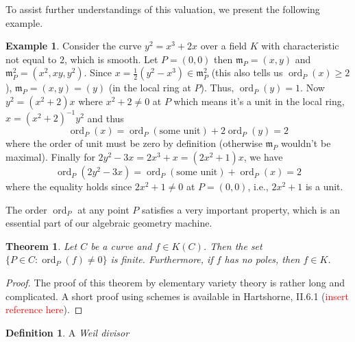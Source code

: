 \documentclass[12pt]{article}
\newtheorem{theorem}{Theorem}[subsection]
\theoremstyle{remark}
\theoremstyle{definition}
\newtheorem{example}{Example}[subsection]
\newtheorem{definition}{Definition}[subsection]
\newcommand{\ord}[0]{\operatorname{ord}}
\begin{document}
        \noindent To assist further understandings of this valuation, we present the following example.
        \begin{example}
            Consider the curve $y^2=x^3+2x$ over a field $K$ with characteristic not equal to $2$, which is smooth. Let $P=(0, 0)$ then $\mathfrak m_P=(x, y)$ and $\mathfrak m_P^2=(x^2,xy,y^2)$. Since $x=\frac{1}{2}(y^2-x^3)\in\mathfrak m_P^2$ (this also tells us $\ord_P(x)\geqslant 2$), $\mathfrak m_P=(x, y)=(y)$ (in the local ring at $P$). Thus, $\ord_P(y)=1$. Now $y^2=(x^2+2)x$ where $x^2+2\neq 0$ at $P$ which means it's a unit in the local ring, $x=(x^2+2)^{-1}y^2$ and thus
            \[\ord_P(x)=\ord_P(\text{some unit})+2\ord_P(y)=2\]
            where the order of unit must be zero by definition (otherwise $\mathfrak m_P$ wouldn't be maximal). Finally for $2y^2-3x=2x^3+x=(2x^2+1)x$, we have
            \[\ord_P(2y^2-3x)=\ord_P(\text{some unit})+\ord_P(x)=2\]
            where the equality holds since $2x^2+1\neq 0$ at $P=(0, 0)$, i.e., $2x^2+1$ is a unit.
        \end{example}
        
        The order $\ord_P$ at any point $P$ satisfies a very important property, which is an essential part of our algebraic geometry machine.
        \begin{theorem}\label{theorem-fin-ord}
            Let $C$ be a curve and $f\in K(C)$. Then the set $\{P\in C:\ord_P(f)\neq 0\}$ is finite. Furthermore, if $f$ has no poles, then $f\in K$.
        \end{theorem}
        \begin{proof}
            The proof of this theorem by elementary variety theory is rather long and complicated. A short proof using schemes is available in Hartshorne, II.6.1 (\textcolor{red}{insert reference here}).
        \end{proof}
        \begin{definition}
            A \textit{Weil divisor}
        \end{definition}
\end{document}
